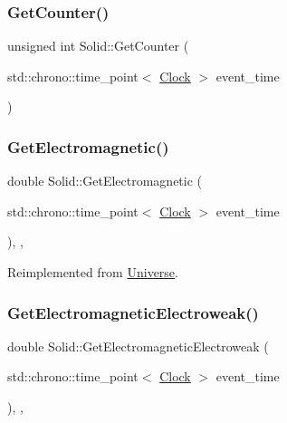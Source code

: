 \mbox{\label{classSolid_a7ca41431033d05957f8be3f49c3aca23}} 
\subsubsection{\texorpdfstring{Get\+Counter()}{GetCounter()}}
{\footnotesize\ttfamily unsigned int Solid\+::\+Get\+Counter (\begin{DoxyParamCaption}\item[{std\+::chrono\+::time\+\_\+point$<$ \mbox{\hyperlink{universe_8h_a0ef8d951d1ca5ab3cfaf7ab4c7a6fd80}{Clock}} $>$}]{event\+\_\+time }\end{DoxyParamCaption})}

\mbox{\label{classSolid_a01cd3c441a4e339927c43536de6d9b5e}} 
\subsubsection{\texorpdfstring{Get\+Electromagnetic()}{GetElectromagnetic()}}
{\footnotesize\ttfamily double Solid\+::\+Get\+Electromagnetic (\begin{DoxyParamCaption}\item[{std\+::chrono\+::time\+\_\+point$<$ \mbox{\hyperlink{universe_8h_a0ef8d951d1ca5ab3cfaf7ab4c7a6fd80}{Clock}} $>$}]{event\+\_\+time }\end{DoxyParamCaption})\hspace{0.3cm}{\ttfamily [inline]}, {\ttfamily [final]}, {\ttfamily [virtual]}}



Reimplemented from \mbox{\hyperlink{classUniverse_a63b850ef3f3394313353109d222bf5d1}{Universe}}.

\mbox{\label{classSolid_aff7ec13bcc584d8330e3f3a1b371bbe6}} 
\subsubsection{\texorpdfstring{Get\+Electromagnetic\+Electroweak()}{GetElectromagneticElectroweak()}}
{\footnotesize\ttfamily double Solid\+::\+Get\+Electromagnetic\+Electroweak (\begin{DoxyParamCaption}\item[{std\+::chrono\+::time\+\_\+point$<$ \mbox{\hyperlink{universe_8h_a0ef8d951d1ca5ab3cfaf7ab4c7a6fd80}{Clock}} $>$}]{event\+\_\+time }\end{DoxyParamCaption})\hspace{0.3cm}{\ttfamily [inline]}, {\ttfamily [final]}, {\ttfamily [virtual]}}



